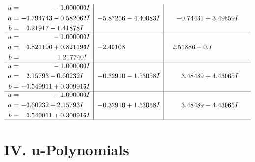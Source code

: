 \documentclass[1p]{elsarticle_modified}
\theoremstyle{definition}
\begin{document}
$$\begin{array}{c|c|c}
\begin{aligned}
u &= \phantom{-0.000000 } -1.000000 I \\
a &= -0.794743 - 0.582062 I \\
b &= \phantom{-}0.21917 - 1.41878 I\end{aligned}
 & -5.87256 - 4.40083 I & -0.74431 + 3.49859 I \\ \hline\begin{aligned}
u &= \phantom{-0.000000 } -1.000000 I \\
a &= \phantom{-}0.821196 + 0.821196 I \\
b &= \phantom{-0.000000 -}1.217740 I\end{aligned}
 & -2.40108\phantom{ +0.000000I} & \phantom{-}2.51886 + 0. I\phantom{ +0.000000I} \\ \hline\begin{aligned}
u &= \phantom{-0.000000 } -1.000000 I \\
a &= \phantom{-}2.15793 - 0.60232 I \\
b &= -0.549911 + 0.309916 I\end{aligned}
 & -0.32910 - 1.53058 I & \phantom{-}3.48489 + 4.43065 I \\ \hline\begin{aligned}
u &= \phantom{-0.000000 } -1.000000 I \\
a &= -0.60232 + 2.15793 I \\
b &= \phantom{-}0.549911 + 0.309916 I\end{aligned}
 & -0.32910 + 1.53058 I & \phantom{-}3.48489 - 4.43065 I\\
 \hline 
 \end{array}$$\newpage
\newpage\renewcommand{\arraystretch}{1}
\centering \section*{ IV. u-Polynomials}
\end{document}
